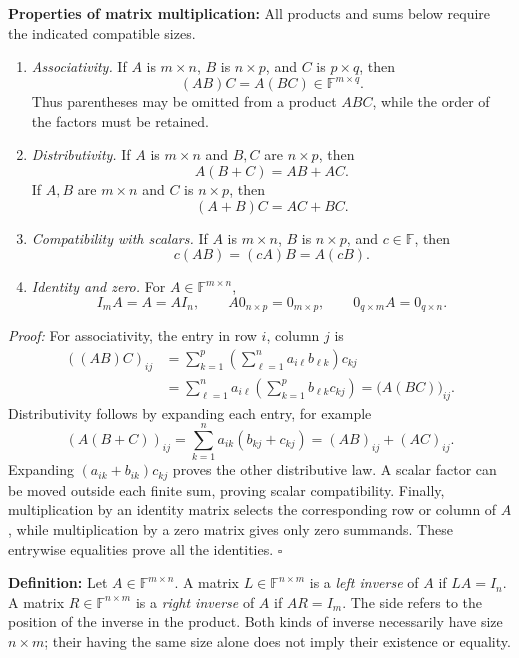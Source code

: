 \documentclass[a4paper,11pt,abstract=true]{scrartcl}
\theoremstyle{dotlessP}
\theoremstyle{dotlessS}
\theoremstyle{remark}
\theoremstyle{definition}
\begin{document}
\begin{claim_box}
\textbf{Properties of matrix multiplication:} All products and
sums below require the indicated compatible sizes.
\begin{enumerate}
    \item \emph{Associativity.} If $A$ is $m\times n$, $B$ is
    $n\times p$, and $C$ is $p\times q$, then
    \[
    (AB)C=A(BC)\in\mathbb{F}^{m\times q}.
    \]
    Thus parentheses may be omitted from a product $ABC$, while
    the order of the factors must be retained.
    \item \emph{Distributivity.} If $A$ is $m\times n$ and $B,C$
    are $n\times p$, then
    \[
    A(B+C)=AB+AC.
    \]
    If $A,B$ are $m\times n$ and $C$ is $n\times p$, then
    \[
    (A+B)C=AC+BC.
    \]
    \item \emph{Compatibility with scalars.} If $A$ is $m\times n$,
    $B$ is $n\times p$, and $c\in\mathbb{F}$, then
    \[
    c(AB)=(cA)B=A(cB).
    \]
    \item \emph{Identity and zero.} For $A\in\mathbb{F}^{m\times n}$,
    \[
    I_m A=A=A I_n,\qquad
    A0_{n\times p}=0_{m\times p},\qquad
    0_{q\times m}A=0_{q\times n}.
    \]
\end{enumerate}

\textit{Proof:} For associativity, the entry in row $i$, column $j$ is
\[
\begin{aligned}
{((AB)C)}_{ij}
&=\sum_{k=1}^p\left(\sum_{\ell=1}^n a_{i\ell}b_{\ell k}\right)c_{kj}\\
&=\sum_{\ell=1}^n a_{i\ell}
  \left(\sum_{k=1}^p b_{\ell k}c_{kj}\right)
={\bigl(A(BC)\bigr)}_{ij}.
\end{aligned}
\]
Distributivity follows by expanding each entry, for example
\[
{(A(B+C))}_{ij}
=\sum_{k=1}^n a_{ik}(b_{kj}+c_{kj})
={(AB)}_{ij}+{(AC)}_{ij}.
\]
Expanding $(a_{ik}+b_{ik})c_{kj}$ proves the other distributive law.
A scalar factor can be moved outside each finite sum, proving scalar
compatibility. Finally, multiplication by an identity matrix selects
the corresponding row or column of $A$, while multiplication by a zero
matrix gives only zero summands. These entrywise equalities prove all
the identities. \hfill$\square$
\end{claim_box}

\begin{claim_box}
\textbf{Definition:} Let
$A\in\mathbb{F}^{m\times n}$. A matrix $L\in\mathbb{F}^{n\times m}$
is a \emph{left inverse} of $A$ if $LA=I_n$. A matrix
$R\in\mathbb{F}^{n\times m}$ is a \emph{right inverse} of $A$ if
$AR=I_m$. The side refers to the position of the inverse in the product.
Both kinds of inverse necessarily have size $n\times m$; their having
the same size alone does not imply their existence or equality.
\end{claim_box}
\end{document}
